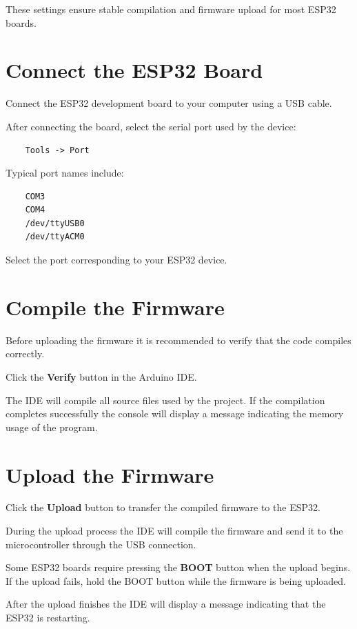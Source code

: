 These settings ensure stable compilation and firmware upload for most ESP32 boards.

\section{Connect the ESP32 Board}

Connect the ESP32 development board to your computer using a USB cable.

After connecting the board, select the serial port used by the device:

\begin{verbatim}
	Tools -> Port
\end{verbatim}

Typical port names include:

\begin{verbatim}
	COM3
	COM4
	/dev/ttyUSB0
	/dev/ttyACM0
\end{verbatim}

Select the port corresponding to your ESP32 device.

\section{Compile the Firmware}

Before uploading the firmware it is recommended to verify that the code compiles correctly.

Click the \textbf{Verify} button in the Arduino IDE.

The IDE will compile all source files used by the project. If the compilation completes successfully the console will display a message indicating the memory usage of the program.

\section{Upload the Firmware}

Click the \textbf{Upload} button to transfer the compiled firmware to the ESP32.

During the upload process the IDE will compile the firmware and send it to the microcontroller through the USB connection.

Some ESP32 boards require pressing the \textbf{BOOT} button when the upload begins. If the upload fails, hold the BOOT button while the firmware is being uploaded.

After the upload finishes the IDE will display a message indicating that the ESP32 is restarting.

